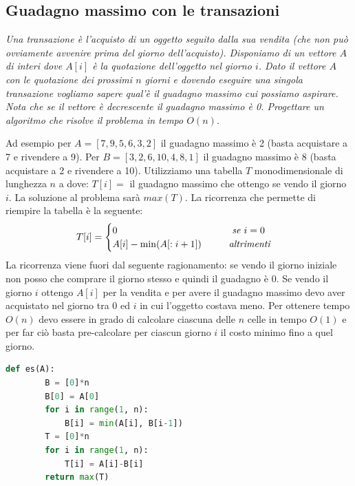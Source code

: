 \subsection{Guadagno massimo con le transazioni}
\textit{Una transazione è l'acquisto di un oggetto seguito dalla sua vendita (che non può ovviamente avvenire prima del giorno dell'acquisto). Disponiamo di un vettore $A$ di interi dove $A[i]$ è la quotazione dell'oggetto nel giorno $i$. Dato il vettore $A$ con le quotazione dei prossimi $n$ giorni e dovendo eseguire una singola transazione vogliamo sapere qual'è il guadagno massimo cui possiamo aspirare. Nota che se il vettore è decrescente il guadagno massimo è 0. Progettare un algoritmo che risolve il problema in tempo $O(n)$.}

Ad esempio per $A = [7, 9, 5, 6, 3, 2]$ il guadagno massimo è 2 (basta acquistare a 7 e rivendere a 9). Per $B = [3, 2, 6, 10, 4, 8, 1]$ il guadagno massimo è 8 (basta acquistare a 2 e rivendere a 10). Utilizziamo una tabella $T$ monodimensionale di lunghezza $n$ a dove: $T[i]=$ il guadagno massimo che ottengo se vendo il giorno $i$. La soluzione al problema sarà $max(T)$. La ricorrenza che permette di riempire la tabella è la seguente:
\begin{equation*}T[i]=
\begin{cases}
    0\hspace{4.2cm}\textit{se }i=0\\
    A[i]-\min(A[:i+1])\hspace{1cm}\textit{altrimenti}
\end{cases}
\end{equation*}
La ricorrenza viene fuori dal seguente ragionamento: se vendo il giorno iniziale non posso che comprare il giorno stesso e quindi il guadagno è 0. Se vendo il giorno $i$ ottengo $A[i]$ per la vendita e per avere il guadagno massimo devo aver acquistato nel giorno tra 0 ed $i$ in cui l'oggetto costava meno. Per ottenere tempo $O(n)$ devo essere in grado di calcolare ciascuna delle $n$ celle in tempo $O(1)$ e per far ciò basta pre-calcolare per ciascun giorno $i$ il costo minimo fino a quel giorno.
\begin{lstlisting}[language=Python]
    def es(A):
        B = [0]*n
        B[0] = A[0]
        for i in range(1, n):
            B[i] = min(A[i], B[i-1])
        T = [0]*n
        for i in range(1, n):
            T[i] = A[i]-B[i]
        return max(T)
\end{lstlisting}

